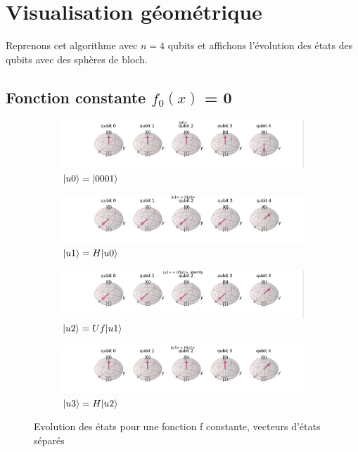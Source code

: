 \documentclass[12pt,a4paper]{article}
\DeclarePairedDelimiter\ket{\lvert}{\rangle}
\begin{document}
\section{Visualisation géométrique}
Reprenons cet algorithme avec $n=4$ qubits et affichons l'évolution des états des qubits avec des sphères de bloch.

\subsection{Fonction constante $f_0(x)$ = 0}
\medbreak
\begin{figure}[ht]
  \begin{subfigure}[b]{0.6\textwidth}
      \centering
      \includegraphics[width=\textwidth]{images/visualization_constant_1_u0.png}
      \caption{$\ket{u0}=\ket{0001}$}
  \end{subfigure}
  \begin{subfigure}[b]{0.6\textwidth}
      \centering
      \includegraphics[width=\textwidth]{images/visualization_constant_1_u1.png}
      \caption{$\ket{u1}=H\ket{u0}$}
  \end{subfigure}
  \begin{subfigure}[b]{0.6\textwidth}
      \centering
      \includegraphics[width=\textwidth]{images/visualization_constant_1_u2.png}
      \caption{$\ket{u2}=Uf\ket{u1}$}
  \end{subfigure}
  \begin{subfigure}[b]{0.6\textwidth}
    \centering
    \includegraphics[width=\textwidth]{images/visualization_constant_1_u3.png}
    \caption{$\ket{u3}=H\ket{u2}$}
\end{subfigure}
     \caption{Evolution des états pour une fonction f constante, vecteurs d'états séparés}
\end{figure}
\end{document}

